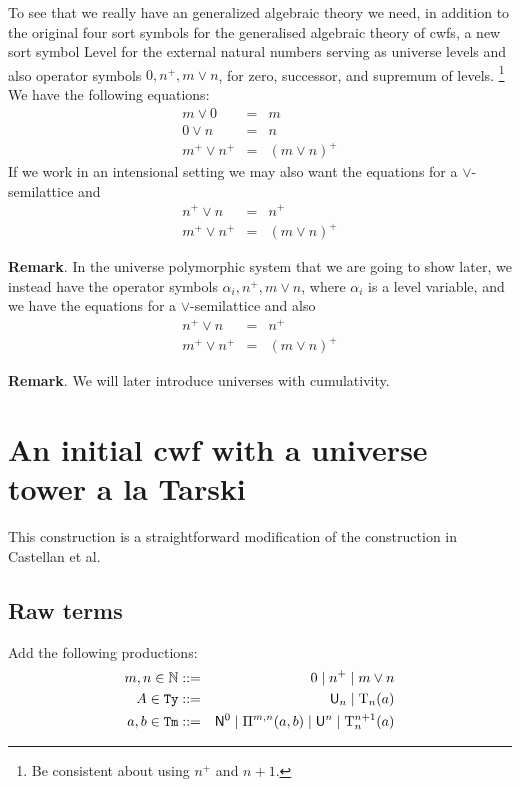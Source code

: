 \documentclass{lmcs}
\newcommand{\Ta}{\mathrm{T}}
\newcommand{\Tan}{\Ta_n}
\newcommand{\Un}{\U_n}
\newcommand{\Level}{\mathrm{Level}}
\begin{document}
To see that we really have an generalized algebraic theory we need, in addition to the original four sort symbols for the generalised algebraic theory of cwfs, a new sort symbol $\Level$
for the external natural numbers serving as universe levels and also operator symbols $0, n^+, m \vee n$, for zero, successor, and supremum of levels. \footnote{Be consistent about using $n^+$ and $n+1$.} We have the following equations:
\begin{eqnarray*}
m \vee 0 &=&m\\
0 \vee n &=& n\\
m^+ \vee n^+ &=& (m \vee n)^+
\end{eqnarray*}
If we work in an intensional setting we may also want the equations for a $\vee$-semilattice and
\begin{eqnarray*}
n^+ \vee n &=& n^+\\
m^+ \vee n^+ &=& (m \vee n)^+
\end{eqnarray*}

{\bf Remark}. In the universe polymorphic system that we are going to show later, we instead have the operator symbols $\alpha_i, n^+, m \vee n$, where $\alpha_i$ is a level variable, and we have the equations for a $\vee$-semilattice and also 
\begin{eqnarray*}
n^+ \vee n &=& n^+\\
m^+ \vee n^+ &=& (m \vee n)^+
\end{eqnarray*}

{\bf Remark}. We will later introduce universes with cumulativity.

\section{An initial cwf with a universe tower a la Tarski}

This construction is a straightforward modification of the construction in Castellan et al. 

\subsection{Raw terms}

Add the following productions:
\begin{eqnarray*}
m, n \in \mathbb{N} &::=& 0 \mid n^+ \mid m \vee n\\
A \in \RawTy &::=& \Un \mid \Tan(a)\\
a,b \in \RawTm &::=&  \N^0 \mid \Pi^{m,n}(a,b) \mid \U^n \mid \Ta_n^{n+1}(a)
\end{eqnarray*}
\end{document}
